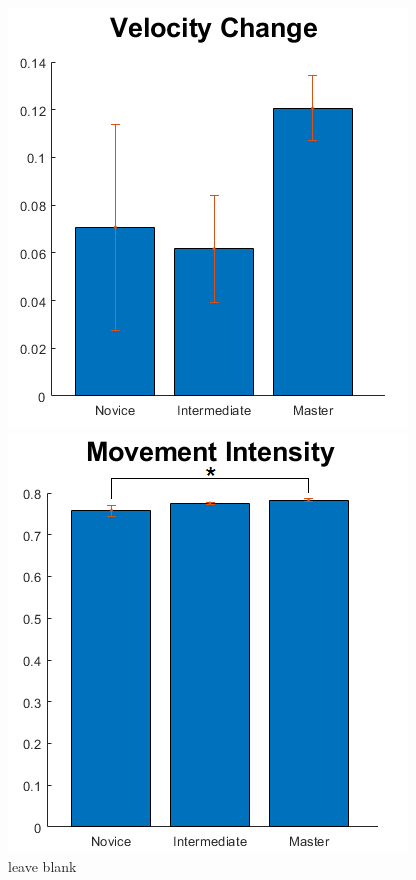 \begin{figure}[H]
	\hfill
	{%
		\begin{minipage}{0.46\linewidth}
			\includegraphics[width=\linewidth]{figures/Distribution}
			\caption{leave blank}
			\label{fig:VelocityChange}
		\end{minipage}
	}\hfill
	{%
		\begin{minipage}{0.46\linewidth}
			\includegraphics[width=\linewidth]{figures/Intensity}

\end{minipage}}
\end{figure}
